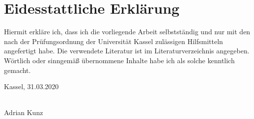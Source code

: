 \chapter*{Eidesstattliche Erklärung}


Hiermit erkläre ich, dass ich die vorliegende Arbeit selbstständig und nur mit den nach der Prüfungsordnung der Universität Kassel zulässigen Hilfsmitteln angefertigt habe.
Die verwendete Literatur ist im Literaturverzeichnis angegeben.
Wörtlich oder sinngemäß übernommene Inhalte habe ich als solche kenntlich gemacht.

\vspace{1cm}

Kassel, 31.03.2020

\begin{flushright}
  \underline{\hspace{7cm}} \\
  Adrian Kunz
\end{flushright}

